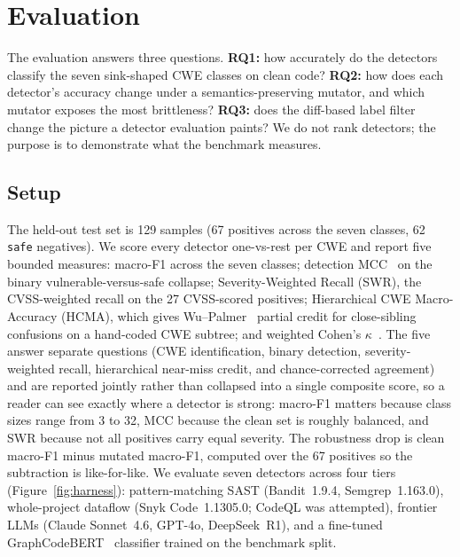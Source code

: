\documentclass[conference]{IEEEtran}
\begin{document}
\section{Evaluation}
\label{sec:eval}

The evaluation answers three questions. \textbf{RQ1:} how accurately do
the detectors classify the seven sink-shaped CWE classes on clean code?
\textbf{RQ2:} how does each detector's accuracy change under a
semantics-preserving mutator, and which mutator exposes the most
brittleness? \textbf{RQ3:} does the diff-based label filter change the
picture a detector evaluation paints? We do not rank detectors; the
purpose is to demonstrate what the benchmark measures.

\subsection{Setup}
The held-out test set is 129 samples (67 positives across the seven
classes, 62 \texttt{safe} negatives). We score every detector one-vs-rest
per CWE and report five bounded measures: macro-F1 across the seven
classes; detection MCC~\cite{chicco2020mcc} on the binary
vulnerable-versus-safe collapse; Severity-Weighted Recall (SWR), the
CVSS-weighted recall on the 27 CVSS-scored positives; Hierarchical CWE
Macro-Accuracy (HCMA), which gives Wu--Palmer~\cite{wupalmer1994} partial
credit for close-sibling confusions on a hand-coded CWE subtree; and
weighted Cohen's $\kappa$~\cite{cohen1968kappa}. The five answer separate
questions (CWE identification, binary detection, severity-weighted
recall, hierarchical near-miss credit, and chance-corrected agreement)
and are reported jointly rather than collapsed into a single composite
score, so a reader can see exactly where a detector is strong: macro-F1
matters because class sizes range from 3 to 32, MCC because the clean set
is roughly balanced, and SWR because not all positives carry equal
severity. The robustness drop is clean macro-F1 minus mutated macro-F1,
computed over the 67 positives so the subtraction is like-for-like. We evaluate seven detectors across four
tiers (Figure~\ref{fig:harness}): pattern-matching SAST (Bandit~1.9.4,
Semgrep~1.163.0), whole-project dataflow (Snyk Code~1.1305.0; CodeQL was
attempted), frontier LLMs (Claude Sonnet~4.6, GPT-4o, DeepSeek~R1), and a
fine-tuned GraphCodeBERT~\cite{graphcodebert} classifier trained on the
benchmark split.
\end{document}
